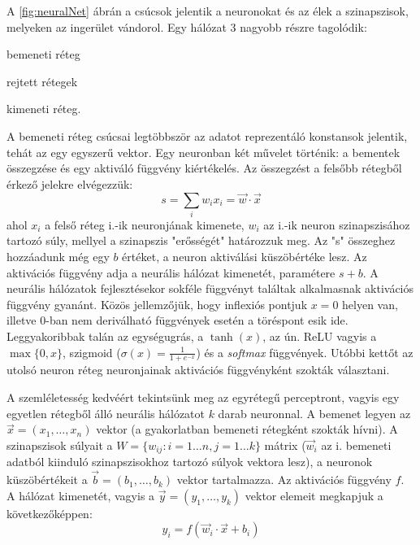 A \ref{fig:neuralNet} ábrán a csúcsok jelentik a neuronokat és az élek a szinapszisok, melyeken az ingerület vándorol. Egy hálózat 3 nagyobb részre tagolódik:
\begin{enumerate*}[label={\alph*)},font=\bfseries]
	\item bemeneti réteg
	\item rejtett rétegek
	\item kimeneti réteg.
\end{enumerate*}
A bemeneti réteg csúcsai legtöbbször az adatot reprezentáló konstansok jelentik, tehát az egy egyszerű vektor.
Egy neuronban két művelet történik: a bementek összegzése és egy aktiváló függvény kiértékelés. Az összegzést a felsőbb rétegből érkező jelekre elvégezzük:
\begin{equation}
	s = \sum_i{w_ix_i} = \vec{w}\cdot\vec{x}
\end{equation}
ahol $x_i$ a felső réteg i.-ik neuronjának kimenete, $w_i$ az i.-ik neuron szinapszisához tartozó súly, mellyel a szinapszis "erősségét" határozzuk meg. Az "s" összeghez hozzáadunk még egy $b$ értéket, a neuron aktiválási küszöbértéke lesz.
Az aktivációs függvény adja a neurális hálózat kimenetét, paramétere $s+b$.
A neurális hálózatok fejlesztésekor sokféle függvényt találtak alkalmasnak aktivációs függvény gyanánt. Közös jellemzőjük, hogy inflexiós pontjuk $x=0$ helyen van, illetve 0-ban nem deriválható függvények esetén a töréspont esik ide. Leggyakoribbak talán az egységugrás, a $\tanh(x)$, az ún. ReLU vagyis a $\max\{0,x\}$, szigmoid ($\sigma(x)= \frac{1}{1+e^{-x}}$) és a \emph{softmax} függvények. Utóbbi kettőt az utolsó neuron réteg neuronjainak aktivációs függvényként szokták választani.

A szemléletesség kedvéért tekintsünk meg az egyrétegű perceptront, vagyis egy egyetlen rétegből álló neurális hálózatot $k$ darab neuronnal. A bemenet legyen az $\vec{x}=(x_1,\dots,x_n)$ vektor (a gyakorlatban bemeneti rétegként szokták hívni). A szinapszisok súlyait a $W=\{w_{ij}:i=1\dots n,j=1\dots k\}$  mátrix ($\vec{w}_i$ az i. bemeneti adatból kiinduló szinapszisokhoz tartozó súlyok vektora lesz), a neuronok küszöbértékeit a $\vec{b}=(b_1,\dots,b_k)$ vektor tartalmazza. Az aktivációs függvény $f$. A hálózat kimenetét, vagyis a  $\vec{y}=(y_1,\dots,y_k)$ vektor elemeit megkapjuk a következőképpen:
\begin{equation}
	y_i = f(\vec{w}_i\cdot\vec{x}+b_i)
\end{equation}

